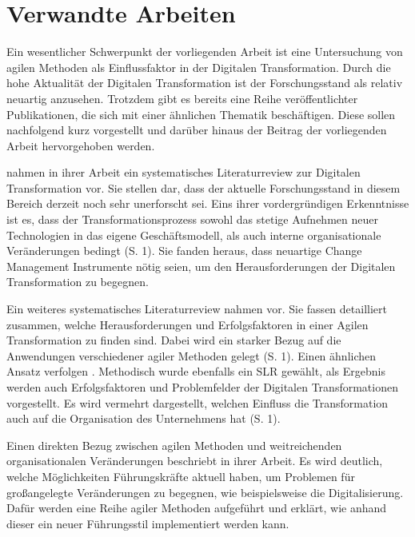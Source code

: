 \chapter{Verwandte Arbeiten}
\label{relatedwork}


Ein wesentlicher Schwerpunkt der vorliegenden Arbeit ist eine  Untersuchung von agilen Methoden als Einflussfaktor in der Digitalen Transformation. Durch die hohe Aktualität der Digitalen Transformation ist der Forschungsstand als relativ neuartig anzusehen. Trotzdem gibt es bereits eine Reihe veröffentlichter Publikationen, die sich mit einer ähnlichen Thematik beschäftigen. Diese sollen nachfolgend kurz vorgestellt und darüber hinaus der Beitrag der vorliegenden Arbeit hervorgehoben werden.

 nahmen in ihrer Arbeit ein systematisches Literaturreview zur Digitalen Transformation vor. Sie stellen dar, dass der aktuelle Forschungsstand in diesem Bereich derzeit noch sehr unerforscht sei. Eins ihrer vordergründigen Erkenntnisse ist es, dass der Transformationsprozess sowohl das stetige Aufnehmen neuer Technologien in das eigene Geschäftsmodell, als auch interne organisationale Veränderungen bedingt (S. 1). Sie fanden heraus, dass neuartige Change Management Instrumente nötig seien, um den Herausforderungen der Digitalen Transformation zu begegnen.

Ein weiteres systematisches Literaturreview nahmen  vor. Sie fassen detailliert zusammen, welche Herausforderungen und Erfolgsfaktoren in einer Agilen Transformation zu finden sind. Dabei wird ein starker Bezug auf die Anwendungen verschiedener agiler Methoden gelegt (S. 1).  Einen ähnlichen Ansatz verfolgen . Methodisch wurde ebenfalls ein SLR gewählt, als Ergebnis werden auch Erfolgsfaktoren und Problemfelder der Digitalen Transformationen vorgestellt. Es wird vermehrt dargestellt, welchen Einfluss die Transformation auch auf die Organisation des Unternehmens hat (S. 1).

Einen direkten Bezug zwischen agilen Methoden und weitreichenden organisationalen Veränderungen beschriebt  in ihrer Arbeit. Es wird deutlich, welche Möglichkeiten Führungskräfte aktuell haben, um Problemen für großangelegte Veränderungen zu begegnen, wie beispielsweise die Digitalisierung. Dafür werden eine Reihe agiler Methoden aufgeführt und erklärt, wie anhand dieser ein neuer Führungsstil implementiert werden kann.

